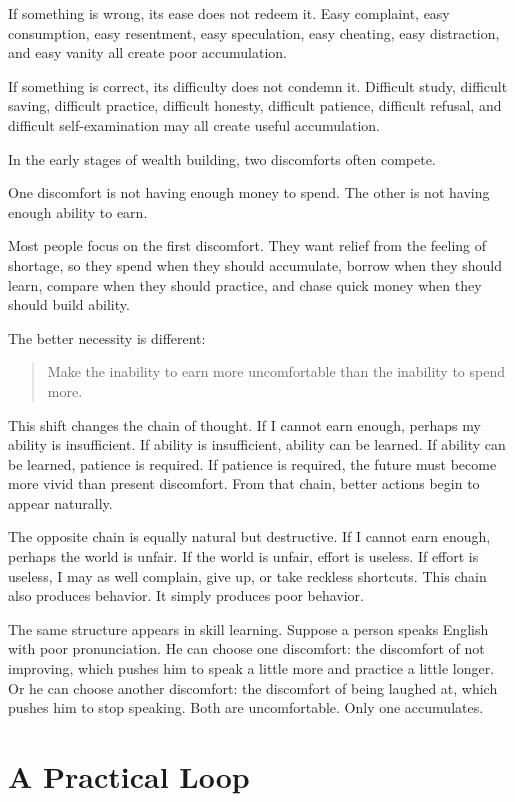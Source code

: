 If something is wrong, its ease does not redeem it. Easy complaint, easy consumption, easy resentment, easy speculation, easy cheating, easy distraction, and easy vanity all create poor accumulation.

If something is correct, its difficulty does not condemn it. Difficult study, difficult saving, difficult practice, difficult honesty, difficult patience, difficult refusal, and difficult self-examination may all create useful accumulation.

In the early stages of wealth building, two discomforts often compete.

One discomfort is not having enough money to spend. The other is not having enough ability to earn.

Most people focus on the first discomfort. They want relief from the feeling of shortage, so they spend when they should accumulate, borrow when they should learn, compare when they should practice, and chase quick money when they should build ability.

The better necessity is different:

\begin{quote}
Make the inability to earn more uncomfortable than the inability to spend more.
\end{quote}

This shift changes the chain of thought. If I cannot earn enough, perhaps my ability is insufficient. If ability is insufficient, ability can be learned. If ability can be learned, patience is required. If patience is required, the future must become more vivid than present discomfort. From that chain, better actions begin to appear naturally.

The opposite chain is equally natural but destructive. If I cannot earn enough, perhaps the world is unfair. If the world is unfair, effort is useless. If effort is useless, I may as well complain, give up, or take reckless shortcuts. This chain also produces behavior. It simply produces poor behavior.

The same structure appears in skill learning. Suppose a person speaks English with poor pronunciation. He can choose one discomfort: the discomfort of not improving, which pushes him to speak a little more and practice a little longer. Or he can choose another discomfort: the discomfort of being laughed at, which pushes him to stop speaking. Both are uncomfortable. Only one accumulates.

\section*{A Practical Loop}

